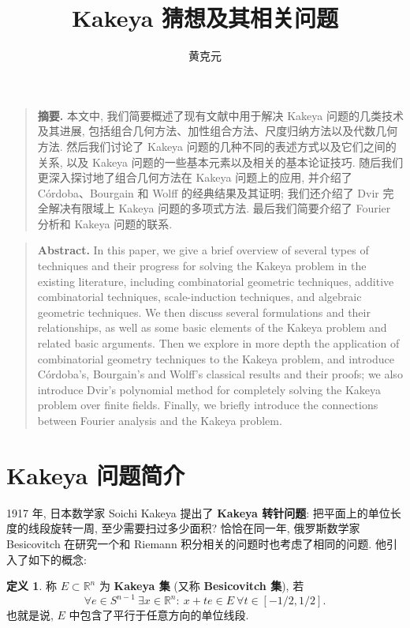 \documentclass[a4paper, zihao=5]{ctexart}
\numberwithin{equation}{section}
\numberwithin{figure}{section}
\numberwithin{table}{section}
\theoremstyle{definition}
\newtheorem*{definition}{\indent 定义}
\newcommand{\R}{\mathbb{R}}
\begin{document}
\title{Kakeya 猜想及其相关问题}
\author{黄克元}
\date{}
\maketitle%

\begin{quote}
    \textbf{摘要.} 本文中, 我们简要概述了现有文献中用于解决 Kakeya 问题的几类技术及其进展, 包括组合几何方法、加性组合方法、尺度归纳方法以及代数几何方法. 然后我们讨论了 Kakeya 问题的几种不同的表述方式以及它们之间的关系, 以及 Kakeya 问题的一些基本元素以及相关的基本论证技巧. 随后我们更深入探讨地了组合几何方法在 Kakeya 问题上的应用, 并介绍了 C\'ordoba、Bourgain 和 Wolff 的经典结果及其证明; 我们还介绍了 Dvir 完全解决有限域上 Kakeya 问题的多项式方法. 最后我们简要介绍了 Fourier 分析和 Kakeya 问题的联系.
\end{quote}

\begin{quote}
    \textbf{Abstract.} In this paper, we give a brief overview of several types of techniques and their progress for solving the Kakeya problem in the existing literature, including combinatorial geometric techniques, additive combinatorial techniques, scale-induction techniques, and algebraic geometric techniques. We then discuss several formulations and their relationships, as well as some basic elements of the Kakeya problem and related basic arguments. Then we explore in more depth the application of combinatorial geometry techniques to the Kakeya problem, and introduce C\'ordoba's, Bourgain's and Wolff's classical results and their proofs; we also introduce Dvir's polynomial method for completely solving the Kakeya problem over finite fields. Finally, we briefly introduce the connections between Fourier analysis and the Kakeya problem.
\end{quote}

\section{Kakeya 问题简介}

1917 年, 日本数学家 Soichi Kakeya 提出了 \textbf{Kakeya 转针问题}: 把平面上的单位长度的线段旋转一周, 至少需要扫过多少面积? 恰恰在同一年, 俄罗斯数学家 Besicovitch 在研究一个和 Riemann 积分相关的问题时也考虑了相同的问题. 他引入了如下的概念:

\begin{definition}
    称 $E\subset\R^n$ 为 \textbf{Kakeya 集} (又称 \textbf{Besicovitch 集}), 若 
    \begin{equation*}
        \forall e\in S^{n-1}\ \exists x\in\R^n:\ x+te\in E\ \forall t\in [-1/2, 1/2].
    \end{equation*}
    也就是说, $E$ 中包含了平行于任意方向的单位线段.
\end{definition}
\end{document}
